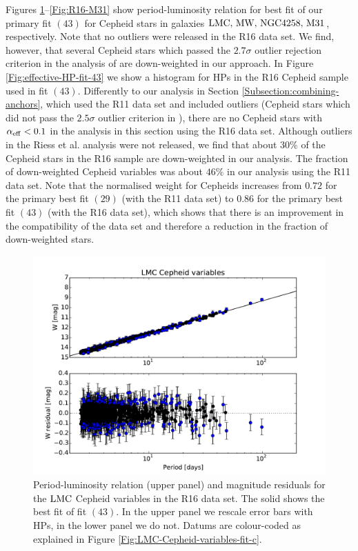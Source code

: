 Figures \ref{Fig:R16-LMC}--\ref{Fig:R16-M31} show period-luminosity relation for best fit of our primary fit $(43)$ for Cepheid stars in galaxies $\mathrm{LMC},\, \mathrm{MW},\, \mathrm{NGC4258},\, \mathrm{M31}$, respectively. Note that no outliers were released in the R16 data set. We find, however, that several Cepheid stars which passed the $2.7\sigma$ outlier rejection criterion in the analysis of \cite{Riess:2016jrr} are down-weighted in our approach. In Figure \ref{Fig:effective-HP-fit-43} we show a histogram for HPs in the R16 Cepheid sample used in fit $(43)$. Differently to our analysis in Section \ref{Subsection:combining-anchors}, which used the R11 data set and included outliers (Cepheid stars which did not pass the $2.5\sigma$ outlier criterion in \cite{Riess:2011yx}), there are no Cepheid stars with $\alpha_{\mathrm{eff}}<0.1$ in the analysis in this section using the R16 data set. Although outliers in the Riess et al. analysis \cite{Riess:2016jrr} were not released, we find that about $30\%$ of the Cepheid stars in the R16 sample are down-weighted in our analysis. The fraction of down-weighted Cepheid variables was about $46\%$ in our analysis using the R11 data set. Note that the normalised weight for Cepheids increases from $0.72$ for the primary best fit $(29)$ (with the R11 data set) to $0.86$ for the primary best fit $(43)$ (with the R16 data set), which shows that there is an improvement in the compatibility of the data set and therefore a reduction in the fraction of down-weighted stars.    

\begin{figure}[hbtp]
\centering
\includegraphics[width=\textwidth]{figures/chapter-h0/effective_HP_cepheids_LMC_R16.pdf}
\caption{Period-luminosity relation (upper panel) and magnitude residuals for the $\mathrm{LMC}$ Cepheid variables in the R16 data set. The solid  shows the best fit of fit $(43)$. In the upper panel we rescale error bars with HPs, in the lower panel we do not. Datums are colour-coded as explained in Figure \ref{Fig:LMC-Cepheid-variables-fit-c}.}
\label{Fig:R16-LMC}
\end{figure}
  
